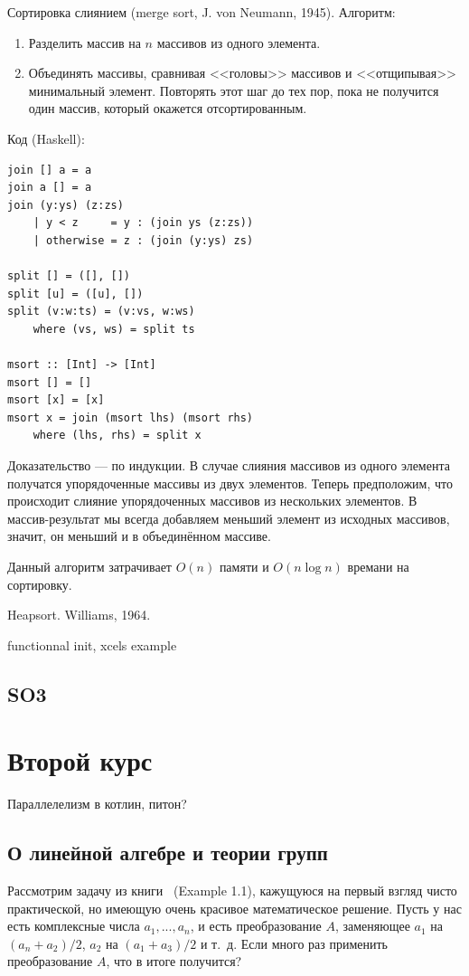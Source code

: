 \documentclass{book}
\begin{document}
Сортировка слиянием (merge sort, J. von Neumann, 1945). Алгоритм:
\begin{enumerate}
  \item Разделить массив на $n$ массивов из одного элемента.
  \item Объединять массивы, сравнивая <<головы>> массивов и <<отщипывая>>
    минимальный элемент. Повторять этот шаг до тех пор, пока не получится один
    массив, который окажется отсортированным.
\end{enumerate}
Код (Haskell):
\begin{verbatim}
join [] a = a
join a [] = a
join (y:ys) (z:zs)
    | y < z     = y : (join ys (z:zs))
    | otherwise = z : (join (y:ys) zs)

split [] = ([], [])
split [u] = ([u], [])
split (v:w:ts) = (v:vs, w:ws)
    where (vs, ws) = split ts

msort :: [Int] -> [Int]
msort [] = []
msort [x] = [x]
msort x = join (msort lhs) (msort rhs)
    where (lhs, rhs) = split x
\end{verbatim}
Доказательство --- по индукции. В случае слияния массивов из одного элемента
получатся упорядоченные массивы из двух элементов. Теперь предположим, что
происходит слияние упорядоченных массивов из нескольких элементов. В
массив-результат мы всегда добавляем меньший элемент из исходных массивов,
значит, он меньший и в объединённом массиве.

Данный алгоритм затрачивает $O(n)$ памяти и $O(n\log n)$ времани на сортировку.

Heapsort. Williams, 1964.


functionnal init, xcels example

\subsection{SO3}

\section{Второй курс}

Параллелелизм в котлин, питон?

\subsection{О линейной алгебре и теории групп}

Рассмотрим задачу из книги~\cite{Kirillov08} (Example 1.1), кажущуюся на первый взгляд чисто
практической, но имеющую очень красивое математическое решение. Пусть у нас есть комплексные числа $a_1, ...,
a_n$, и есть преобразование $A$, заменяющее $a_1$ на $(a_n + a_2) / 2$, $a_2$ на $(a_1 + a_3) /
2$ и т.~д. Если много раз применить преобразование $A$, что в итоге получится?
\end{document}
